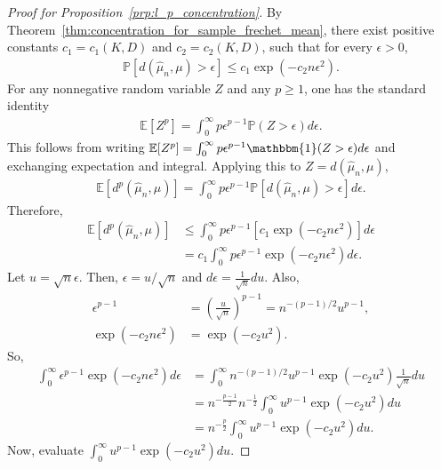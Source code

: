 \begin{proof}[Proof for Proposition~\ref{prp:l_p_concentration}]
    By Theorem~\ref{thm:concentration_for_sample_frechet_mean}, there exist positive constants $c_1 = c_1(K, D)$ and $c_2 = c_2(K, D)$, such that for every $\epsilon > 0$,
    \begin{align*}
        \mathbb{P}\left[d(\hat{\mu}_n, \mu) > \epsilon \right] \leq c_1 \exp\left(-c_2 n \epsilon^2 \right).
    \end{align*}
    For any nonnegative random variable $Z$ and any $p \geq 1$, one has the standard identity
    \begin{align*}
        \mathbb{E}[Z^p] = \int^\infty_0 p \epsilon^{p - 1}\mathbb{P}(Z > \epsilon)d\epsilon.
    \end{align*}
    This follows from writing $\mathbb{E}[Z^p] = \int^\infty_0 p \epsilon^{p - 1}\mathbbm{1}(Z > \epsilon)d\epsilon$ and exchanging expectation and integral.
    Applying this to $Z = d(\hat{\mu}_n, \mu)$,
    \begin{align*}
        \mathbb{E}[d^p(\hat{\mu}_n, \mu)] = \int^\infty_0 p \epsilon^{p - 1}\mathbb{P}[d(\hat{\mu}_n, \mu) > \epsilon]d\epsilon.
    \end{align*}
    Therefore,
    \begin{align*}
        \mathbb{E}[d^p(\hat{\mu}_n, \mu)] &\leq \int^\infty_0 p \epsilon^{p - 1}\left[c_1 \exp(-c_2 n \epsilon^2)\right]d\epsilon \\
        &= c_1 \int^\infty_0 p\epsilon^{p - 1} \exp(-c_2 n \epsilon^2) d\epsilon.
    \end{align*}
    Let $u = \sqrt{n}\epsilon$.
    Then, $\epsilon = u / \sqrt{n}$ and $d\epsilon = \frac{1}{\sqrt{n}}du$.
    Also,
    \begin{align*}
        \epsilon^{p-1} &= (\frac{u}{\sqrt{n}})^{p-1} = n^{-(p-1)/2}u^{p-1}, \\
        \exp(-c_2 n \epsilon^2) &= \exp(-c_2 u^2).
    \end{align*}
    So,
    \begin{align*}
        \int^\infty_0 \epsilon^{p-1}\exp(-c_2 n \epsilon^2)d\epsilon &= \int^\infty_0 n^{-(p-1)/2}u^{p-1} \exp(-c_2 u^2)\frac{1}{\sqrt{n}}du \\
        &= n^{-\frac{p-1}{2}}n^{-\frac{1}{2}}\int^\infty_0 u^{p-1}\exp(-c_2 u^2)du \\
        &= n^{-\frac{p}{2}}\int^\infty_0 u^{p-1}\exp(-c_2 u^2)du.
    \end{align*}
    Now, evaluate $\int^\infty_0 u^{p-1}\exp(-c_2 u^2)du$.

\end{proof}
